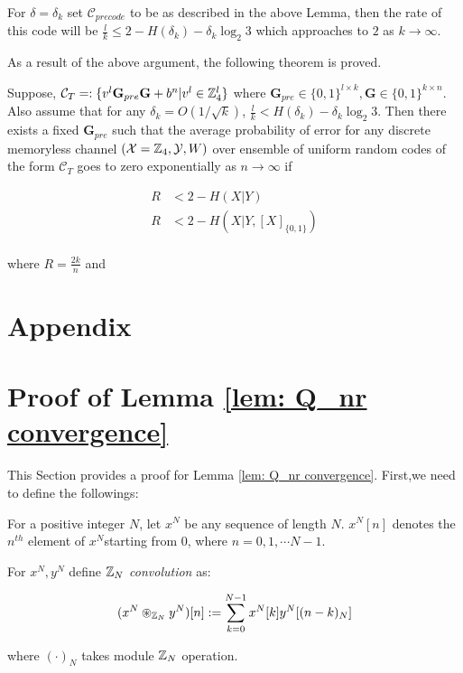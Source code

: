 For $\delta=\delta_k$ set $\mathcal{C}_{precode}$ to be as described in the above  Lemma, then the rate of this code will be $\frac{l}{k}\leq 2- H(\delta_k)-\delta_k \log_2 3$ which approaches to $2$ as $k \rightarrow \infty$. 

As a result of the above argument,  the following theorem is proved.



\begin{thm}
Suppose, $\mathcal{C}_{T}=:\{v^l\mathbf{G}_{pre} \mathbf{G}+b^n | v^l\in \mathbb{Z}_4^l\} $ where $\mathbf{G}_{pre} \in \{0,1 \}^{l\times k}, \mathbf{G} \in \{ 0,1 \}^{k \times n}$. Also assume that for any  $ \delta_k = O(1/\sqrt{k})$, $\frac{l}{k} < H(\delta_k)-\delta_k \log_2 3$. Then there exists a fixed $\mathbf{G}_{pre}$ such that the average probability of error for any discrete memoryless channel $(\mathcal{X}=\mathbb{Z}_4,\mathcal{Y},W)$ over ensemble of uniform random codes of the form $\mathcal{C}_{T}$  goes to zero exponentially as $n\rightarrow \infty$ if

\begin{align*}
R&<2-H(X|Y)\\
R&< 2-H(X|Y,[X]_{\{ 0,1\}})\\
\end{align*}

where $R=\frac{2k}{n}$ and

\end{thm}





\newpage
\appendix

\section*{Appendix}
\section{Proof of Lemma \ref{lem: Q_nr convergence}}
This Section provides a proof for Lemma \ref{lem: Q_nr convergence}. First,we need to define the followings:


\begin{definition}
For a positive integer $N$, let $x^N$ be any sequence of length $N$. $x^N[n]$ denotes the $n^{th}$ element of $x^N$starting from $0$, where $n=0,1,\cdots N-1$.

For $x^N,y^N$ define \textit{$\mathbb{Z}_N$ convolution} as:

\begin{align*}
(x^N \circledast_{\mathbb{Z}_N} y^N)[n] :=\sum_{k=0}^{N-1} x^N[k]y^N[(n-k)_N]
\end{align*}

where $(\cdot)_N$ takes module $\mathbb{Z}_N$ operation.
\end{definition}

